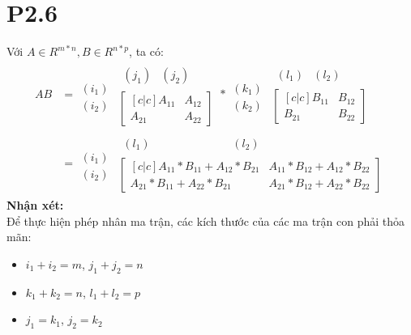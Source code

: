 \documentclass[a4paper,11pt]{article}
\theoremstyle{mytheor}
\begin{document}
\section*{P2.6}
Với $A \in R^{m*n}, B \in R^{n*p}$, ta có:
\begin{align}
    \nonumber AB &= \begin{matrix}\\ (i_1) \\ (i_2) \end{matrix}\begin{matrix}\begin{matrix}(j_1)&(j_2) \end{matrix}\\
            \begin{bmatrix} [c|c]
            A_{11} & A_{12}\\ \hline
            A_{21} & A_{22}
            \end{bmatrix} \end{matrix}
        *\begin{matrix}\\ (k_1) \\ (k_2) \end{matrix}\begin{matrix}\begin{matrix}(l_1)&(l_2) \end{matrix}\\
            \begin{bmatrix} [c|c]
            B_{11} & B_{12}\\ \hline
            B_{21} & B_{22}
            \end{bmatrix} \end{matrix}\\
    \nonumber    &= 
    \begin{matrix} \\ (i_1) \\ (i_2) \end{matrix}
    \begin{matrix}
            \begin{matrix}
                (l_1) & & & & & & & & & (l_2)
            \end{matrix}\\
            \begin{bmatrix} [c|c]
            A_{11}*B_{11}+A_{12}*B_{21} & A_{11}*B_{12}+A_{12}*B_{22}\\ \hline
            A_{21}*B_{11}+A_{22}*B_{21} & A_{21}*B_{12}+A_{22}*B_{22}
            \end{bmatrix}
    \end{matrix}
\end{align}
\textbf{Nhận xét:}\\
Để thực hiện phép nhân ma trận, các kích thước của các ma trận con phải thỏa mãn:
\begin{itemize}
    \item $i_1+i_2=m$, $j_1+j_2=n$
    \item $k_1+k_2=n$, $l_1+l_2=p$
    \item $j_1=k_1$, $j_2=k_2$
\end{itemize}
\end{document}
